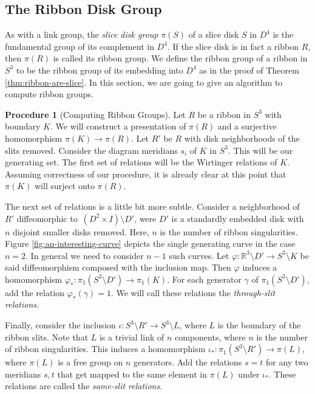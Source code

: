 \documentclass{article}
\theoremstyle{definition}
\newtheorem{algo}[theorem]{Procedure}
\begin{document}
\subsection{The Ribbon Disk Group}

As with a link group, the \textit{slice disk group} $\pi(S)$ of a slice disk $S$ in $D^4$ is the fundamental group of its complement in $D^4$. If the slice disk is in fact a ribbon $R$, then $\pi(R)$ is called its ribbon group. We define the ribbon group of a ribbon in $S^3$ to be the ribbon group of its embedding into $D^4$ as in the proof of Theorem \ref{thm:ribbon-are-slice}. In this section, we are going to give an algorithm to compute ribbon groups.

\begin{algo}[Computing Ribbon Groups]\label{alg:ribbon-groups}
Let $R$ be a ribbon in $S^3$ with boundary $K$. We will construct a presentation of $\pi(R)$ and a surjective homomorphism $\pi(K) \rightarrow \pi(R)$. Let $R'$ be $R$ with disk neighborhoods of the slits removed. Consider the diagram meridians $s_i$ of $K$ in $S^3$. This will be our generating set. The first set of relations will be the Wirtinger relations of $K$. Assuming correctness of our procedure, it is already clear at this point that $\pi(K)$ will surject onto $\pi(R)$.

The next set of relations is a little bit more subtle. Consider a neighborhood of $R'$ diffeomorphic to~$(D^2 \times I) \setminus D'$, were $D'$ is a standardly embedded disk with $n$ disjoint smaller disks removed. Here, $n$ is the number of ribbon singularities. Figure \ref{fig:an-interesting-curve} depicts the single generating curve in the case $n = 2$. In general we need to consider $n-1$ such curves. Let $\varphi: \mathbb{R}^3 \setminus D' \rightarrow S^3 \setminus K$ be said diffeomorphism composed with the inclusion map. Then $\varphi$ induces a homomorphism $\varphi_*: \pi_1(S^3 \setminus D') \rightarrow \pi_1(K)$. For each generator $\gamma$ of $\pi_1(S^3 \setminus D')$, add the relation $\varphi_*(\gamma) = 1$. We will call these relations the \textit{through-slit relations}.

Finally, consider the inclusion $\iota: S^3 \setminus R' \rightarrow S^3 \setminus L$, where $L$ is the boundary of the ribbon slits. Note that $L$ is a trivial link of $n$ components, where $n$ is the number of ribbon singularities. This induces a homomorphism $\iota_*: \pi_1(S^3 \setminus R') \rightarrow \pi(L)$, where $\pi(L)$ is a free group on $n$ generators. Add the relations $s = t$ for any two meridians $s, t$ that get mapped to the same element in $\pi(L)$ under $\iota_*$. These relations are called the \textit{same-slit relations}.
\end{algo}
\end{document}
